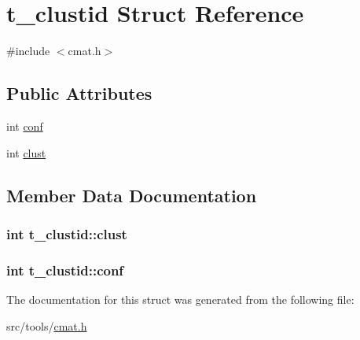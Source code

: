\hypertarget{structt__clustid}{\section{t\-\_\-clustid \-Struct \-Reference}
\label{structt__clustid}
}


{\ttfamily \#include $<$cmat.\-h$>$}

\subsection*{\-Public \-Attributes}
\begin{DoxyCompactItemize}
\item 
int \hyperlink{structt__clustid_ae9317a779236474b3c5dfb0d417359b0}{conf}
\item 
int \hyperlink{structt__clustid_a6ecd31a60baf890e93828bd11b23c2e7}{clust}
\end{DoxyCompactItemize}


\subsection{\-Member \-Data \-Documentation}
\hypertarget{structt__clustid_a6ecd31a60baf890e93828bd11b23c2e7}{
\subsubsection[{clust}]{\setlength{\rightskip}{0pt plus 5cm}int {\bf t\-\_\-clustid\-::clust}}}\label{structt__clustid_a6ecd31a60baf890e93828bd11b23c2e7}
\hypertarget{structt__clustid_ae9317a779236474b3c5dfb0d417359b0}{
\subsubsection[{conf}]{\setlength{\rightskip}{0pt plus 5cm}int {\bf t\-\_\-clustid\-::conf}}}\label{structt__clustid_ae9317a779236474b3c5dfb0d417359b0}


\-The documentation for this struct was generated from the following file\-:\begin{DoxyCompactItemize}
\item 
src/tools/\hyperlink{cmat_8h}{cmat.\-h}\end{DoxyCompactItemize}

